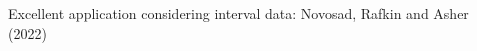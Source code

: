 \documentclass[notes,11pt, aspectratio=169]{beamer}
\begin{document}
\begin{frame}{Excellent application considering interval data: Novosad, Rafkin and Asher (2022)}
\begin{columns}[onlytextwidth, T]
\begin{column}{.5\textwidth}

\end{column}
\end{columns}
\end{frame}
\end{document}
